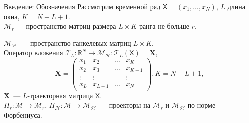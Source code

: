 \documentclass[ucs, notheorems, handout]{beamer}
\newcommand{\tX}[1]{\mathsf{#1}}
\begin{document}
\begin{frame}{Введение: Обозначения}
Рассмотрим временной ряд $\tX{X}=(x_1, \ldots, x_{N})$, $L$ длина окна, $K=N-L+1$.\\
\vspace{1em}
$\mathcal{M}_{r}$ --- пространство матриц размера $L \times K$ ранга не больше $r$.

$\mathcal{M}_{\mathcal{H}}$~--- пространство ганкелевых матриц $L\times K$.\\
\vspace{1em}
Оператор вложения $\mathcal{T}_L:\mathbb{R}^N \rightarrow \mathcal{M}_{\mathcal{H}}: \mathcal{T}_L (\tX{X}) = \mathbf{X} $,\\
$$\mathbf{X} = \begin{pmatrix}
           x_1 & x_2 & \ldots & x_{K}\\
           x_2 & x_3 & \ldots & x_{K+1}\\
           \vdots & \vdots & & \vdots\\
           x_{L} & x_{L+1} & \ldots & x_{N}
         \end{pmatrix}, K = N - L + 1,$$
$\mathbf{X}$~--- $L$-траекторная матрица $\tX{X}$.\\
\vspace{1em}
$\Pi_{r}:\mathcal{M}\rightarrow \mathcal{M}_r$,
$\Pi_{\mathcal{H}}:\mathcal{M} \rightarrow \mathcal{M}_{\mathcal{H}}$~--- проекторы на $\mathcal{M}_{r}$ и $\mathcal{M}_{\mathcal{H}}$ по норме Форбениуса.


\end{frame}
\end{document}
